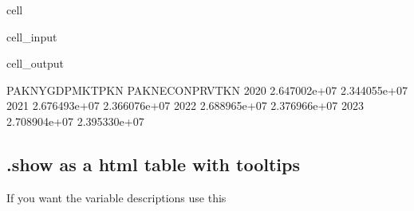 \documentclass[letterpaper,10pt,english]{jupyterBook}
\begin{document}
\begin{sphinxuseclass}{cell}\begin{sphinxVerbatimInput}

\begin{sphinxuseclass}{cell_input}
\begin{sphinxVerbatim}[commandchars=\\\{\}]
\PYG{p}{[}\PYG{p}{]}
\end{sphinxVerbatim}

\end{sphinxuseclass}\end{sphinxVerbatimInput}
\begin{sphinxVerbatimOutput}

\begin{sphinxuseclass}{cell_output}
\begin{sphinxVerbatim}[commandchars=\\\{\}]
      PAKNYGDPMKTPKN  PAKNECONPRVTKN
2020    2.647002e+07    2.344055e+07
2021    2.676493e+07    2.366076e+07
2022    2.688965e+07    2.376966e+07
2023    2.708904e+07    2.395330e+07
\end{sphinxVerbatim}

\end{sphinxuseclass}\end{sphinxVerbatimOutput}

\end{sphinxuseclass}

\subsection{.show  as a html table with tooltips}
\label{\detokenize{content/notebooks/modelflow_features:show-as-a-html-table-with-tooltips}}
\sphinxAtStartPar
If you want the variable descriptions use this
\end{document}
